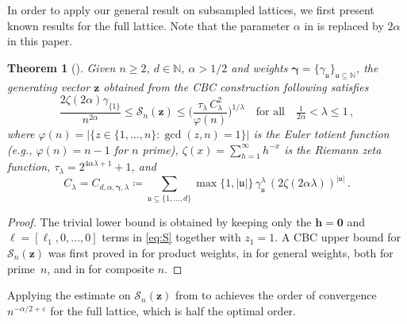 \documentclass[a4paper]{amsart}
\newcommand{\bsell}{{\bm{\ell}}}
\newtheorem{theorem}{Theorem}[section]
\begin{document}
In order to apply our general result on subsampled lattices, we first present known results for the full lattice.
Note that the parameter $\alpha$ in \cite{KMN24} is replaced by $2\alpha$ in this paper.

\begin{theorem}[{\cite[Theorem~3.3]{KMN24}}]\label{Skorobov} Given $n\ge 2$, $d\in\mathds N$, $\alpha>1/2$ and weights $\bm\gamma = \{\gamma_{\mathfrak u}\}_{\mathfrak u\subseteq\mathds N}$, the generating vector $\bm z$ obtained from the CBC construction following \cite[Algorithm~3.2]{KMN24} satisfies \begin{equation*}
      \frac{2\zeta(2\alpha)\gamma_{\{1\}}}{n^{2\alpha}} 
      \le \mathcal S_n(\bm z)
        \le \Big( \frac{\tau_\lambda \, C_\lambda^2}{\varphi(n)}
        \Big)^{1/\lambda} 
        \quad\mbox{for all}\quad \tfrac{1}{2\alpha} < \lambda \le 1\,,
    \end{equation*}
    where $\varphi(n) = |\{z\in \{1,\ldots, n\} : \gcd(z,n)=1\}|$ is the Euler totient function (e.g., $\varphi(n) = n-1$ for $n$ prime), $\zeta(x) = \sum_{h=1}^{\infty}h^{-x}$ is the Riemann zeta function, $\tau_\lambda = 2^{4\alpha\lambda+1}+1$, and
    \begin{equation}\label{eq:C}
        C_\lambda
        = C_{d,\alpha,\bm\gamma,\lambda}
        \coloneqq \sum_{\mathfrak u\subseteq\{1,\dots,d\}} \max\{1,|\mathfrak u|\} \, \gamma_{\mathfrak u}^{\lambda} \, (2\zeta(2\alpha\lambda))^{|\mathfrak u|} \,.
    \end{equation}
\end{theorem} 

\begin{proof} The trivial lower bound is obtained by keeping only the $\bm h = \bm 0$ and $\bsell = [\ell_1,0,\ldots,0]$ terms in \eqref{eq:S} together with $z_1 = 1$.
A CBC upper bound for $\mathcal S_n(\bm z)$ was first proved in \cite{DKKS07} for product weights, in \cite{CKNS20} for general weights, both for prime~$n$, and in \cite{KMN24} for composite $n$.
\end{proof} 

Applying the estimate on $\mathcal S_n(\bm z)$ from  to  achieves the order of convergence $n^{-\alpha/2+\varepsilon}$ for the full lattice, which is half the optimal order.
\end{document}
